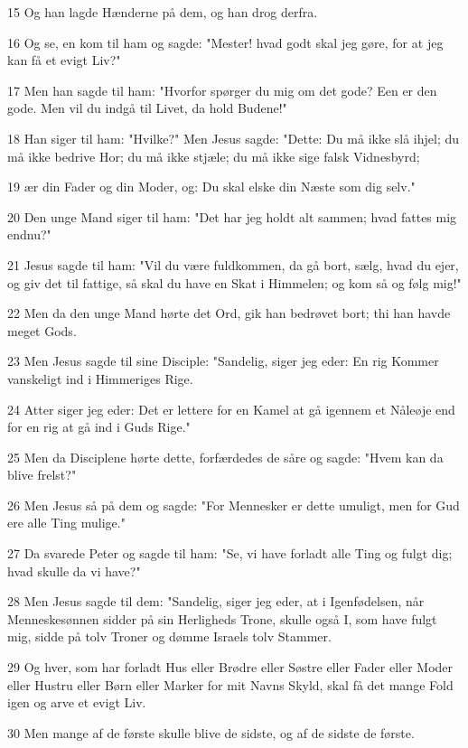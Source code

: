 \par 15 Og han lagde Hænderne på dem, og han drog derfra.
\par 16 Og se, en kom til ham og sagde: "Mester! hvad godt skal jeg gøre, for at jeg kan få et evigt Liv?"
\par 17 Men han sagde til ham: "Hvorfor spørger du mig om det gode? Een er den gode. Men vil du indgå til Livet, da hold Budene!"
\par 18 Han siger til ham: "Hvilke?" Men Jesus sagde: "Dette: Du må ikke slå ihjel; du må ikke bedrive Hor; du må ikke stjæle; du må ikke sige falsk Vidnesbyrd;
\par 19 ær din Fader og din Moder, og: Du skal elske din Næste som dig selv."
\par 20 Den unge Mand siger til ham: "Det har jeg holdt alt sammen; hvad fattes mig endnu?"
\par 21 Jesus sagde til ham: "Vil du være fuldkommen, da gå bort, sælg, hvad du ejer, og giv det til fattige, så skal du have en Skat i Himmelen; og kom så og følg mig!"
\par 22 Men da den unge Mand hørte det Ord, gik han bedrøvet bort; thi han havde meget Gods.
\par 23 Men Jesus sagde til sine Disciple: "Sandelig, siger jeg eder: En rig Kommer vanskeligt ind i Himmeriges Rige.
\par 24 Atter siger jeg eder: Det er lettere for en Kamel at gå igennem et Nåleøje end for en rig at gå ind i Guds Rige."
\par 25 Men da Disciplene hørte dette, forfærdedes de såre og sagde: "Hvem kan da blive frelst?"
\par 26 Men Jesus så på dem og sagde: "For Mennesker er dette umuligt, men for Gud ere alle Ting mulige."
\par 27 Da svarede Peter og sagde til ham: "Se, vi have forladt alle Ting og fulgt dig; hvad skulle da vi have?"
\par 28 Men Jesus sagde til dem: "Sandelig, siger jeg eder, at i Igenfødelsen, når Menneskesønnen sidder på sin Herligheds Trone, skulle også I, som have fulgt mig, sidde på tolv Troner og dømme Israels tolv Stammer.
\par 29 Og hver, som har forladt Hus eller Brødre eller Søstre eller Fader eller Moder eller Hustru eller Børn eller Marker for mit Navns Skyld, skal få det mange Fold igen og arve et evigt Liv.
\par 30 Men mange af de første skulle blive de sidste, og af de sidste de første.

